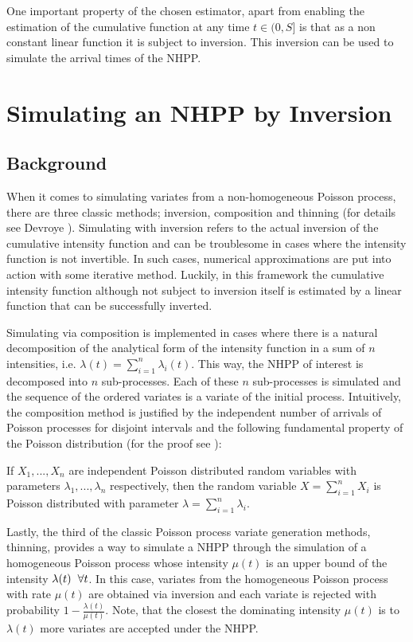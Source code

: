 \documentclass[12pt]{article}
\theoremstyle{definition}
\begin{document}
One important property of the chosen estimator, apart from enabling the estimation of the cumulative function at any time $t\in (0, S]$ is that as a non constant linear function it is subject to inversion. This inversion can be used to simulate the arrival times of the NHPP.

\section{Simulating an NHPP by Inversion}
\subsection{Background}
When it comes to simulating variates from a non-homogeneous Poisson process, there  are three classic methods; inversion, composition and thinning (for details see Devroye \cite{classicsimulation}). Simulating with inversion refers to the actual inversion of the cumulative intensity function and can be troublesome in cases where the intensity function is not invertible. In such cases, numerical approximations are put into action with some iterative method. Luckily, in this framework the cumulative intensity function although not subject to inversion itself is estimated by a linear function that can be successfully inverted.

Simulating via composition is implemented in cases where there is a natural decomposition of the analytical form of the intensity function in a sum of $n$ intensities, i.e. $\lambda(t)=\sum_{i=1}^n \lambda_i(t)$. This way, the NHPP of interest is decomposed into $n$ sub-processes. Each of these $n$ sub-processes is simulated and the sequence of the ordered variates is a variate of the initial process. Intuitively, the composition method is justified by the independent number of arrivals of Poisson processes for disjoint intervals and the following fundamental property of the Poisson distribution (for the proof see \cite{ross}):

If $X_1,..., X_n$ are independent Poisson distributed random variables with parameters $\lambda_1,..., \lambda_n$ respectively, then the random variable $X=\sum_{i=1}^n X_i$ is Poisson distributed with parameter $\lambda=\sum_{i=1}^n \lambda_i$. 

Lastly, the third of the classic Poisson process variate generation methods, thinning, provides a way to simulate a NHPP through the simulation of a homogeneous Poisson process whose intensity $\mu(t)$ is an upper bound of the intensity $\lambda(t)\hspace{0.2cm}\forall t$. In this case, variates from the homogeneous Poisson process with rate $\mu(t)$ are obtained via inversion and each variate is rejected with probability $1-\frac{\lambda(t)}{\mu(t)}$. Note, that the closest the dominating intensity $\mu(t)$ is to $\lambda(t)$ more variates are accepted under the NHPP. 
\end{document}
